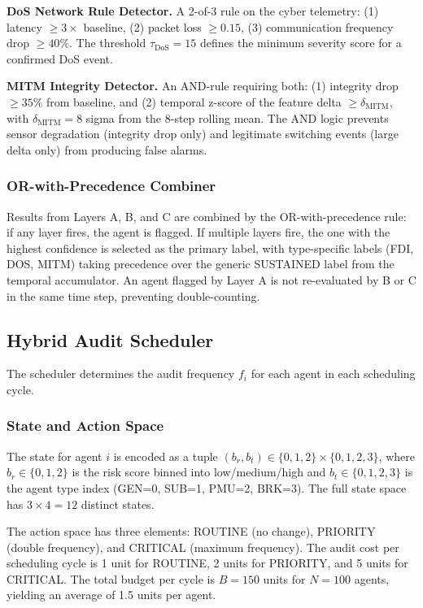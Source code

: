 \textbf{DoS Network Rule Detector.} A 2-of-3 rule on the cyber telemetry: (1) latency
$\geq 3 \times$ baseline, (2) packet loss $\geq 0.15$, (3) communication frequency drop
$\geq 40\%$. The threshold $\tau_{\text{DoS}} = 15$ defines the minimum severity score for a
confirmed DoS event.

\textbf{MITM Integrity Detector.} An AND-rule requiring both: (1) integrity drop
$\geq 35\%$ from baseline, and (2) temporal z-score of the feature delta $\geq \delta_{\text{MITM}}$,
with $\delta_{\text{MITM}} = 8$ sigma from the 8-step rolling mean. The AND logic prevents sensor
degradation (integrity drop only) and legitimate switching events (large delta only) from producing
false alarms.

\subsubsection{OR-with-Precedence Combiner}
\label{sec:combiner}

Results from Layers A, B, and C are combined by the OR-with-precedence rule: if any layer fires,
the agent is flagged. If multiple layers fire, the one with the highest confidence is selected as
the primary label, with type-specific labels (FDI, DOS, MITM) taking precedence over the generic
SUSTAINED label from the temporal accumulator. An agent flagged by Layer A is not re-evaluated by
B or C in the same time step, preventing double-counting.

\subsection{Hybrid Audit Scheduler}
\label{sec:scheduler}

The scheduler determines the audit frequency $f_i$ for each agent in each scheduling cycle.

\subsubsection{State and Action Space}

The state for agent $i$ is encoded as a tuple $(b_r, b_t) \in \{0,1,2\} \times \{0,1,2,3\}$, where
$b_r \in \{0,1,2\}$ is the risk score binned into low/medium/high and $b_t \in \{0,1,2,3\}$
is the agent type index (GEN=0, SUB=1, PMU=2, BRK=3). The full state space has
$3 \times 4 = 12$ distinct states.

The action space has three elements: ROUTINE (no change), PRIORITY (double frequency), and CRITICAL
(maximum frequency). The audit cost per scheduling cycle is 1 unit for ROUTINE, 2 units for
PRIORITY, and 5 units for CRITICAL. The total budget per cycle is $B = 150$ units for $N = 100$
agents, yielding an average of 1.5 units per agent.

